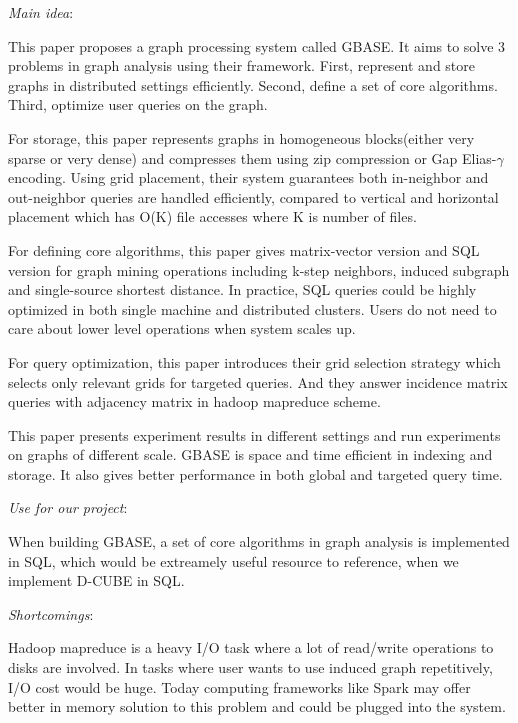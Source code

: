 \documentclass[12pt]{article}
\begin{document}
\begin{itemize*}
\item {\em Main idea}:

This paper proposes a graph processing system called GBASE. It aims to solve 3 problems in graph analysis using their framework. First, represent and store graphs in distributed settings efficiently. Second, define a set of core algorithms. Third, optimize user queries on the graph. 
 
For storage, this paper represents graphs in homogeneous blocks(either very sparse or very dense) and compresses them using zip compression or Gap Elias-$\gamma$ encoding. Using grid placement, their system guarantees both in-neighbor and out-neighbor queries are handled efficiently, compared to vertical and horizontal placement which has O(K) file accesses where K is number of files.

For defining core algorithms, this paper gives matrix-vector version and SQL version for graph mining operations including k-step neighbors, induced subgraph and single-source shortest distance. In practice, SQL queries could be highly optimized in both single machine and distributed clusters. Users do not need to care about lower level operations when system scales up.

For query optimization, this paper introduces their grid selection strategy which selects only relevant grids for targeted queries. And they answer incidence matrix queries with adjacency matrix in hadoop mapreduce scheme.

This paper presents experiment results in different settings and run experiments on graphs of different scale. GBASE is space and time efficient in indexing and storage. It also gives better performance in both global and targeted query time. 

\item {\em Use for our project}:

When building GBASE, a set of core algorithms in graph analysis is implemented in SQL, which would be extreamely useful resource to reference, when we implement D-CUBE in SQL. 
\item {\em Shortcomings}:

Hadoop mapreduce is a heavy I/O task where a lot of read/write operations to disks are involved. In tasks where user wants to use induced graph repetitively, I/O cost would be huge. Today computing frameworks like Spark may offer better in memory solution to this problem and could be plugged into the system.  
\end{itemize*}
\end{document}
